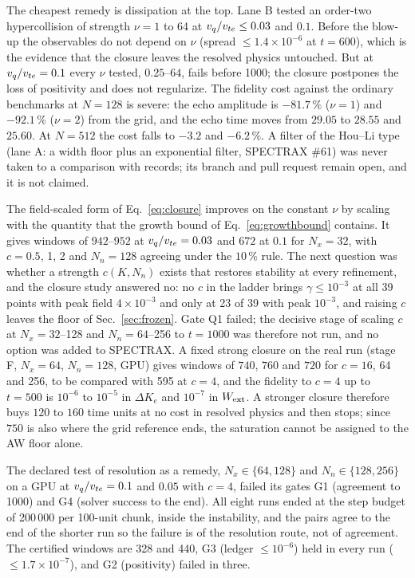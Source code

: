 The cheapest remedy is dissipation at the top. Lane B tested an order-two hypercollision of strength $\nu=1$ to 64 at $v_q/v_{te}\le0.03$ and $0.1$. Before the blow-up the observables do not depend on $\nu$ (spread $\le1.4\times10^{-6}$ at $t=600$), which is the evidence that the closure leaves the resolved physics untouched. But at $v_q/v_{te}=0.1$ every $\nu$ tested, $0.25$--$64$, fails before 1000; the closure postpones the loss of positivity and does not regularize. The fidelity cost against the ordinary benchmarks at $N=128$ is severe: the echo amplitude is $-81.7\,\%$ ($\nu=1$) and $-92.1\,\%$ ($\nu=2$) from the grid, and the echo time moves from $29.05$ to $28.55$ and $25.60$. At $N=512$ the cost falls to $-3.2$ and $-6.2\,\%$. A filter of the Hou--Li type (lane A: a width floor plus an exponential filter, SPECTRAX \#61) was never taken to a comparison with records; its branch and pull request remain open, and it is not claimed.

The field-scaled form of Eq.~\eqref{eq:closure} improves on the constant $\nu$ by scaling with the quantity that the growth bound of Eq.~\eqref{eq:growthbound} contains. It gives windows of $942$--$952$ at $v_q/v_{te}=0.03$ and $672$ at $0.1$ for $N_x=32$, with $c=0.5$, 1, 2 and $N_n=128$ agreeing under the $10\,\%$ rule. The next question was whether a strength $c(K,N_n)$ exists that restores stability at every refinement, and the closure study answered no: no $c$ in the ladder brings $\gamma\le10^{-3}$ at all 39 points with peak field $4\times10^{-3}$ and only at 23 of 39 with peak $10^{-3}$, and raising $c$ leaves the floor of Sec.~\ref{sec:frozen}. Gate Q1 failed; the decisive stage of scaling $c$ at $N_x=32$--128 and $N_n=64$--256 to $t=1000$ was therefore not run, and no option was added to SPECTRAX. A fixed strong closure on the real run (stage F, $N_x=64$, $N_n=128$, GPU) gives windows of $740$, $760$ and $720$ for $c=16$, 64 and 256, to be compared with 595 at $c=4$, and the fidelity to $c=4$ up to $t=500$ is $10^{-6}$ to $10^{-5}$ in $\Delta K_e$ and $10^{-7}$ in $W_{\rm ext}$. A stronger closure therefore buys $120$ to $160$ time units at no cost in resolved physics and then stops; since $750$ is also where the grid reference ends, the saturation cannot be assigned to the AW floor alone.

The declared test of resolution as a remedy, $N_x\in\{64,128\}$ and $N_n\in\{128,256\}$ on a GPU at $v_q/v_{te}=0.1$ and $0.05$ with $c=4$, failed its gates G1 (agreement to 1000) and G4 (solver success to the end). All eight runs ended at the step budget of 200\,000 per 100-unit chunk, inside the instability, and the pairs agree to the end of the shorter run so the failure is of the resolution route, not of agreement. The certified windows are 328 and 440, G3 (ledger $\le10^{-6}$) held in every run ($\le1.7\times10^{-7}$), and G2 (positivity) failed in three.

